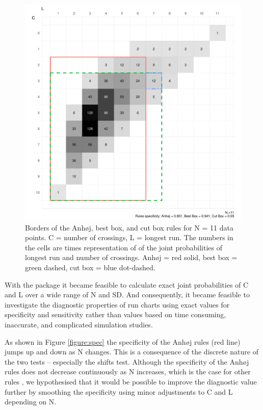 \begin{figure}[htbp]
  \centering
  \includegraphics[width=\textwidth]{fig_box11.pdf}
  \caption{Borders of the Anhøj, best box, and cut box rules for N = 11 data points. 
           C = number of crossings, L = longest run.
           The numbers in the cells are times representation of of the joint
           probabilities of longest run and number of crossings.
           Anhøj = red solid, best box = green dashed, cut box = blue dot-dashed.}
  \label{figure:box11}
\end{figure}

With the  package it became feasible to calculate
exact joint probabilities of C and L over a wide range of N and SD. And
consequently, it became feasible to investigate the diagnostic
properties of run charts using exact values for specificity and
sensitivity rather than values based on time consuming, inaccurate, and
complicated simulation studies.

As shown in Figure \ref{figure:spec} the specificity of the Anhøj rules
(red line) jumps up and down as N changes. This is a consequence of the
discrete nature of the two tests -- especially the shifts test. Although
the specificity of the Anhøj rules does not decrease continuously as N
increases, which is the case for other rules \citep{anhoej2014}, we
hypothesised that it would be possible to improve the diagnostic value
further by smoothing the specificity using minor adjustments to C and L
depending on N.

